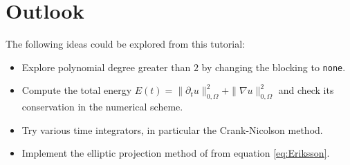 \documentclass[a4paper,12pt]{article}
\begin{document}
\section{Outlook}

The following ideas could be explored from this tutorial:
\begin{itemize}
\item Explore polynomial degree greater than $2$ by changing the blocking
to \lstinline{none}.
\item Compute the total energy $E(t) = \|\partial_t u\|_{0,\Omega}^2 +
  \|\nabla u\|_{0,\Omega}^2$ and check its conservation in
the numerical scheme.
\item Try various time integrators, in particular the Crank-Nicolson method.
\item Implement the elliptic projection method of \cite{Eriksson} from
equation \eqref{eq:Eriksson}.
\end{itemize}



\end{document}
